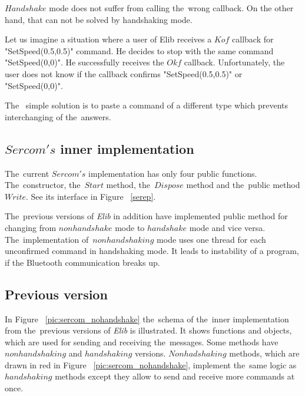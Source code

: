   $Handshake$ mode does not suffer from calling the~wrong callback. 
  On the other hand, that can not be solved by handshaking mode.
  \begin{example}
  Let us imagine a situation where a user of Elib receives a $Kof$ callback for "SetSpeed(0.5,0.5)" command.
  He decides to stop with the same command "SetSpeed(0,0)". He successfully receives the $Okf$ callback.
  Unfortunately, the user does not know if the callback confirms "SetSpeed(0.5,0.5)" or "SetSpeed(0,0)".
  \end{example}
  The~ simple solution is to paste a command of a different type which prevents interchanging of the~answers.

\subsection{$Sercom's$ inner implementation}\label{sec:versions}
  The~current $Sercom's$ implementation has only four public functions.
  The~constructor, the~$Start$ method, the~$Dispose$ method and the~public method $Write$. 
  See its interface in Figure ~\ref{serep}.	

  The~previous versions of {\it Elib} in addition have implemented public 
  method for changing from $nonhandshake$ mode to 
  $handshake$ mode and vice versa.
  The~implementation of~$nonhandshaking$ mode uses one 
  thread for each unconfirmed command in handshaking mode.
  It leads to instability of a program, if the Bluetooth communication breaks up.
  
\subsection*{Previous version}\label{previous}
  In  Figure ~\ref{pic:sercom_nohandshake} the~schema of the~inner implementation 
  from the~previous versions of {\it Elib} is illustrated.
  It shows functions and objects, which are used for sending and receiving the~messages.
  Some methods have $nonhandshaking$ and $handshaking$ versions.
  $Nonhadshaking$ methods, which are drawn in red	in Figure ~\ref{pic:sercom_nohandshake}, implement the~same logic 
  as $handshaking$ methods except they allow to send and receive more commands
  at once.

